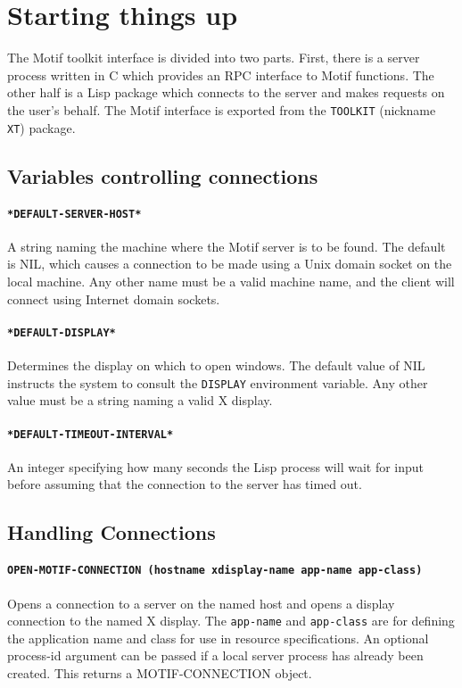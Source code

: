 \documentclass{article}
\begin{document}
\section{Starting things up}

The Motif toolkit interface is divided into two parts.  First, there is
a server process written in C which provides an RPC interface to Motif
functions.  The other half is a Lisp package which connects to the server
and makes requests on the user's behalf.  The Motif interface is exported
from the \texttt{TOOLKIT} (nickname \texttt{XT}) package.


\subsection{Variables controlling connections}

\paragraph{\texttt{*DEFAULT-SERVER-HOST*}} A string naming the machine
where the Motif server is to be found.  The default is NIL, which
causes a connection to be made using a Unix domain socket on the local
machine.  Any other name must be a valid machine name, and the client
will connect using Internet domain sockets.

\paragraph{\texttt{*DEFAULT-DISPLAY*}} Determines the display on which
to open windows. The default value of NIL instructs the system to
consult the \texttt{DISPLAY} environment variable.  Any other value
must be a string naming a valid X display.

\paragraph{\texttt{*DEFAULT-TIMEOUT-INTERVAL*}} An integer specifying
how many seconds the Lisp process will wait for input before assuming
that the connection to the server has timed out.


\subsection{Handling Connections}

\paragraph{\texttt{OPEN-MOTIF-CONNECTION (hostname xdisplay-name
app-name app-class)}} Opens a connection to a server on the named host
and opens a display connection to the named X display.  The
\texttt{app-name} and \texttt{app-class} are for defining the
application name and class for use in resource specifications.  An
optional process-id argument can be passed if a local server process
has already been created.  This returns a MOTIF-CONNECTION object.
\end{document}
